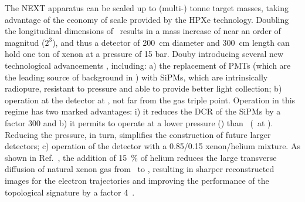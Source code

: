 The NEXT apparatus can be scaled up to (multi-) tonne target masses, taking advantage of the economy of scale provided by the HPXe technology. Doubling the longitudinal dimensions of \Next\ results in a mass increase of near an order of magnitud ($2^3$), and thus a detector of \SI{200}{cm} diameter and  \SI{300}{cm} length can hold one ton of xenon at a pressure of 15 bar. Douby introducing several new technological advancements \cite{Cadenas:2017vcu}, including: a)  the replacement of PMTs (which are the leading source of background in \Next) with SiPMs, which are intrinsically radiopure, resistant to pressure and able to provide better light collection; b) operation at the detector at \NtkOperatingTemperature, not far from the gas triple point.  Operation in this regime has two marked advantages: i) it reduces the DCR of the SiPMs by a factor \num{300} and b) it permits to operate at a lower pressure (\NtkOperatingPressure) than \Next\ (\NextPressure\ at \NextTemperature).  Reducing the pressure, in turn, simplifies the construction of future larger detectors; c) operation of the detector with a 0.85/0.15 xenon/helium mixture. As shown in Ref.~\cite{Felkai:2017oeq}, the addition of \SI{15}{\percent} of helium reduces the large transverse diffusion of natural xenon gas from \TransverseDiffusionPureXenon\ to \TransverseDiffusionXeHe, resulting in sharper reconstructed images for the electron trajectories and improving the performance of the topological signature by a factor \num{4}~\cite{Renner:2017ey}.
%
%
%
